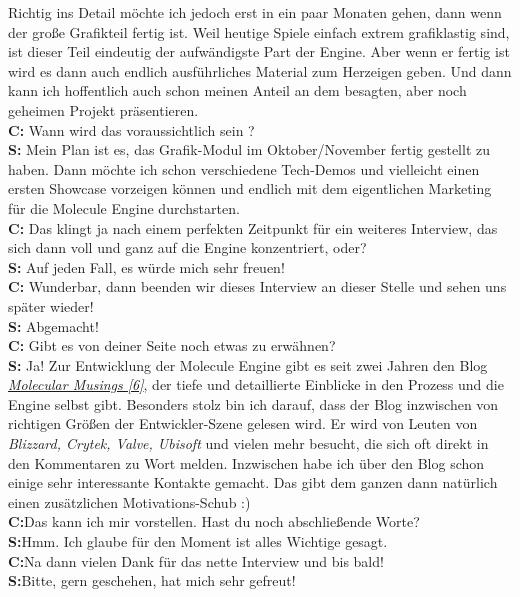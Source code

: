 Richtig ins Detail möchte ich jedoch erst in ein paar Monaten gehen, dann wenn der große Grafikteil fertig ist. Weil heutige Spiele einfach extrem grafiklastig sind, ist dieser Teil eindeutig der aufwändigste Part der Engine. Aber wenn er fertig ist wird es dann auch endlich ausführliches Material zum Herzeigen geben. Und dann kann ich hoffentlich auch schon meinen Anteil an dem besagten, aber noch geheimen Projekt präsentieren. \\
\textbf{C:} Wann wird das voraussichtlich sein ? \\
\textbf{S:} Mein Plan ist es, das Grafik-Modul im Oktober/November fertig gestellt zu haben. Dann möchte ich schon verschiedene Tech-Demos und vielleicht einen ersten Showcase vorzeigen können und endlich mit dem eigentlichen Marketing für die Molecule Engine durchstarten. \\
\textbf{C:} Das klingt ja nach einem perfekten Zeitpunkt für ein weiteres Interview, das sich dann voll und ganz auf die Engine konzentriert, oder? \\
\textbf{S:} Auf jeden Fall, es würde mich sehr freuen! \\
\textbf{C:} Wunderbar, dann beenden wir dieses Interview an dieser Stelle und sehen uns später wieder!\\
\textbf{S:} Abgemacht! \\
\textbf{C:} Gibt es von deiner Seite noch etwas zu erwähnen? \\
\textbf{S:} Ja! Zur Entwicklung der Molecule Engine gibt es seit zwei Jahren den Blog \href{http://molecularmusings.wordpress.com/}{\textit{Molecular Musings [6]}}, der tiefe und detaillierte Einblicke in den Prozess und die Engine selbst gibt. Besonders stolz bin ich darauf, dass der Blog inzwischen von richtigen Größen der Entwickler-Szene gelesen wird. Er wird von Leuten von \textit{Blizzard, Crytek, Valve, Ubisoft} und vielen mehr besucht, die sich oft direkt in den Kommentaren zu Wort melden. Inzwischen habe ich über den Blog schon einige sehr interessante Kontakte gemacht. Das gibt dem ganzen dann natürlich einen zusätzlichen Motivations-Schub :) \\
\textbf{C:}Das kann ich mir vorstellen. Hast du noch abschließende Worte? \\
\textbf{S:}Hmm. Ich glaube für den Moment ist alles Wichtige gesagt. \\
\textbf{C:}Na dann vielen Dank für das nette Interview und bis bald! \\
\textbf{S:}Bitte, gern geschehen, hat mich sehr gefreut! \\

